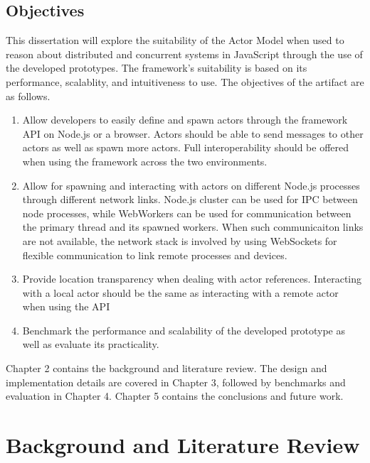 \documentclass[12pt, a4paper]{report}
\theoremstyle{definition}
\theoremstyle{definition}%
\theoremstyle{definition}%
\theoremstyle{definition}%
\theoremstyle{definition}%
\theoremstyle{definition}%
\begin{document}
\section{Objectives}
This dissertation will explore the suitability of the Actor Model when used to reason about distributed and concurrent systems in JavaScript through the use of the developed prototypes. The framework's suitability is based on its performance, scalablity, and intuitiveness to use. The objectives of the artifact are as follows.
\begin{enumerate}
    \item Allow developers to easily define and spawn actors through the framework API on Node.js or a browser. Actors should be able to send messages to other actors as well as spawn more actors. Full interoperability should be offered when using the framework across the two environments.
    \item Allow for spawning and interacting with actors on different Node.js processes through different network links. Node.js cluster\cite{cluster} can be used for IPC between node processes, while WebWorkers\cite{webworkers} can be used for communication between the primary thread and its spawned workers. When such communicaiton links are not available, the network stack is involved by using WebSockets for flexible communication to link remote processes and devices.
    \item Provide location transparency when dealing with actor references. Interacting with a local actor should be the same as interacting with a remote actor when using the API
    \item Benchmark the performance and scalability of the developed prototype as well as evaluate its practicality.
\end{enumerate}

Chapter 2 contains the background and literature review. The design and implementation details are covered in Chapter 3, followed by benchmarks and evaluation in Chapter 4. Chapter 5 contains the conclusions and future work.

\chapter{Background and Literature Review}
\end{document}

